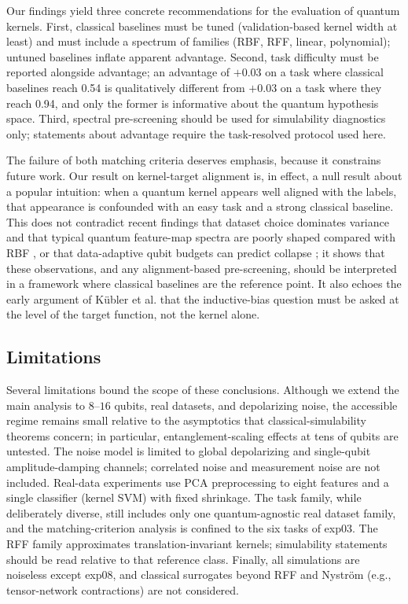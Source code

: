 \documentclass[a4paper,unpublished,onecolumn,nopdfoutputerror,12pt]{quantumarticle}
\begin{document}
Our findings yield three concrete recommendations for the evaluation of quantum kernels.
First, classical baselines must be tuned (validation-based kernel width at least) and
must include a spectrum of families (RBF, RFF, linear, polynomial); untuned baselines
inflate apparent advantage. Second, task difficulty must be reported alongside
advantage; an advantage of $+0.03$ on a task where classical baselines reach 0.54 is
qualitatively different from $+0.03$ on a task where they reach 0.94, and only the
former is informative about the quantum hypothesis space. Third, spectral
pre-screening should be used for simulability diagnostics only; statements about
advantage require the task-resolved protocol used here.

The failure of both matching criteria deserves emphasis, because it constrains future
work. Our result on kernel-target alignment is, in effect, a null result about a
popular intuition: when a quantum kernel appears well aligned with the labels, that
appearance is confounded with an easy task and a strong classical baseline. This does
not contradict recent findings that dataset choice dominates variance and that typical
quantum feature-map spectra are poorly shaped compared with RBF \cite{kakavand2026},
or that data-adaptive qubit budgets can predict collapse \cite{appel2026}; it shows
that these observations, and any alignment-based pre-screening, should be interpreted
in a framework where classical baselines are the reference point. It also echoes the
early argument of K\"ubler et al. \cite{kubler2021} that the inductive-bias question
must be asked at the level of the target function, not the kernel alone.

\subsection{Limitations}
\label{sec:limitations}

Several limitations bound the scope of these conclusions. Although we extend the main
analysis to $8$--$16$ qubits, real datasets, and depolarizing noise, the accessible
regime remains small relative to the asymptotics that classical-simulability theorems
concern; in particular, entanglement-scaling effects at tens of qubits are untested.
The noise model is limited to global depolarizing and single-qubit amplitude-damping
channels; correlated noise and measurement noise are not included. Real-data experiments use PCA preprocessing to
eight features and a single classifier (kernel SVM) with fixed shrinkage. The task
family, while deliberately diverse, still includes only one quantum-agnostic real
dataset family, and the matching-criterion analysis is confined to the six tasks of
exp03. The RFF family approximates translation-invariant kernels; simulability
statements should be read relative to that reference class. Finally, all
simulations are noiseless except exp08, and classical surrogates beyond RFF and
Nystr\"om (e.g., tensor-network contractions) are not considered.
\end{document}
